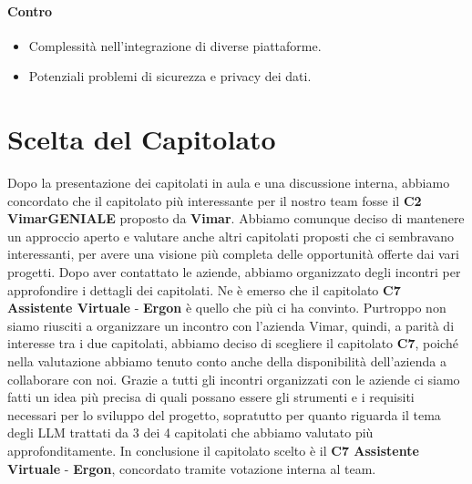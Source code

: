 \documentclass{article}
\begin{document}
\paragraph{Contro}
\begin{itemize}
    \item Complessità nell'integrazione di diverse piattaforme.
    \item Potenziali problemi di sicurezza e privacy dei dati.
\end{itemize}

\section{Scelta del Capitolato}

Dopo la presentazione dei capitolati in aula e una discussione interna, abbiamo concordato che 
il capitolato più interessante per il nostro team fosse il \textbf{C2 VimarGENIALE} proposto da \textbf{Vimar}.
Abbiamo comunque deciso di mantenere un approccio aperto e valutare anche altri capitolati proposti che
ci sembravano interessanti, per avere una visione più completa delle opportunità offerte dai vari progetti.
Dopo aver contattato le aziende, abbiamo organizzato degli incontri per approfondire i dettagli dei capitolati. 
Ne è emerso che il capitolato \textbf{C7 Assistente Virtuale} - \textbf{Ergon} è quello che più ci ha convinto.
Purtroppo non siamo riusciti a organizzare un incontro con l'azienda Vimar, quindi, a parità di interesse
tra i due capitolati, abbiamo deciso di scegliere il capitolato \textbf{C7}, poiché nella valutazione abbiamo 
tenuto conto anche della disponibilità dell'azienda a collaborare con noi.
Grazie a tutti gli incontri organizzati con le aziende ci siamo fatti un idea più precisa di quali possano
essere gli strumenti e i requisiti necessari per lo sviluppo del progetto, sopratutto per quanto riguarda
il tema degli LLM trattati da 3 dei 4 capitolati che abbiamo valutato più approfonditamente.
In conclusione il capitolato scelto è il \textbf{C7 Assistente Virtuale} - \textbf{Ergon}, 
concordato tramite votazione interna al team.
\end{document}

